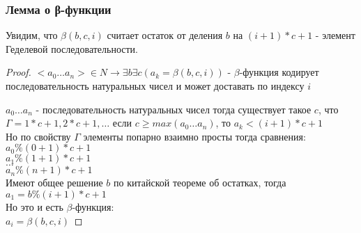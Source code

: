 \subsubsection{Лемма о β-функции}
\label{sec-11-3-3}
\begin{lemma}
Увидим, что $\beta(b,c,i)$ считает остаток от деления $b$ на
$(i + 1) * c + 1$ - элемент Геделевой последовательности.
\end{lemma}
\begin{proof}
$<a_0 \ldots a_n> \in N \to \exists b \exists c (a_k=β(b,c,i))$ - $\beta$-функция кодирует
последовательность натуральных чисел и может
доставать по индексу $i$

$a_0 \ldots a_n$  - последовательность натуральных чисел
тогда существует такое $c$, что $\Gamma = 1 * c + 1, 2 * c + 1,\ldots$
если $c \geq max(a_0 \ldots a_n)$, то $a_k < (i + 1) * c + 1$\\
Но по свойству $\Gamma$ элементы попарно взаимно просты
тогда сравнения:\\
$a_0 \% (0+1)*c+1$\\
$a_1 \% (1+1)*c+1$\\
$\ldots$\\
$a_n \% (n + 1) * c + 1$\\
Имеют общее решение $b$ по китайской теореме об остатках, тогда $a_1 = b \% (i+1)*c + 1$\\
Но это и есть $\beta$-функция:\\
$a_i = \beta(b,c,i)$
\end{proof}
